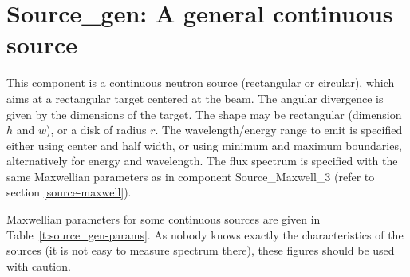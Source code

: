\section{Source\_gen: A general continuous source}
\label{source-gen}


This component is a continuous neutron source (rectangular or circular), which aims at
a rectangular target centered at the beam.
The angular divergence is given by the dimensions of the target.
The shape may be rectangular (dimension $h$ and $w$), or a disk of radius $r$.
The wavelength/energy range to emit is specified either using center and half width, or using minimum and maximum boundaries, alternatively for energy and wavelength.
The flux spectrum is specified with the same Maxwellian parameters as in component Source\_Maxwell\_3 (refer to section \ref{source-maxwell}).

Maxwellian parameters for some continuous sources
are given in Table~\ref{t:source_gen-params}. As nobody knows exactly the characteristics of the sources (it is not easy to measure spectrum there), these figures should be used with caution.

